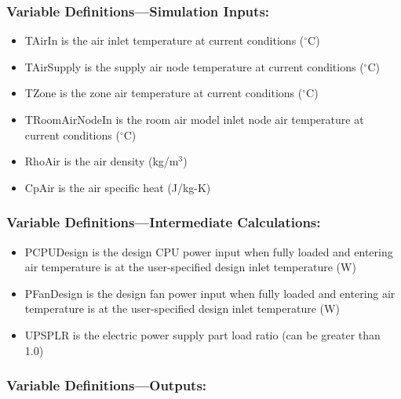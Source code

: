 \subsubsection{Variable Definitions---Simulation Inputs:}\label{variable-definitions-simulation-inputs}

\begin{itemize}
\tightlist
\item
  TAirIn is the air inlet temperature at current conditions ($^\circ$C)
\item
  TAirSupply is the supply air node temperature at current conditions ($^\circ$C)
\item
  TZone is the zone air temperature at current conditions ($^\circ$C)
\item
  TRoomAirNodeIn is the room air model inlet node air temperature at current conditions ($^\circ$C)
\item
  RhoAir is the air density (kg/m$^3$)
\item
  CpAir is the air specific heat (J/kg-K)
\end{itemize}

\subsubsection{Variable Definitions---Intermediate Calculations:}\label{variable-definitions-intermediate-calculations}

\begin{itemize}
\tightlist
\item
  PCPUDesign is the design CPU power input when fully loaded and entering air temperature is at the user-specified design inlet temperature (W)
\item
  PFanDesign is the design fan power input when fully loaded and entering air temperature is at the user-specified design inlet temperature (W)
\item
  UPSPLR is the electric power supply part load ratio (can be greater than 1.0)
\end{itemize}

\subsubsection{Variable Definitions---Outputs:}\label{variable-definitions-outputs}


